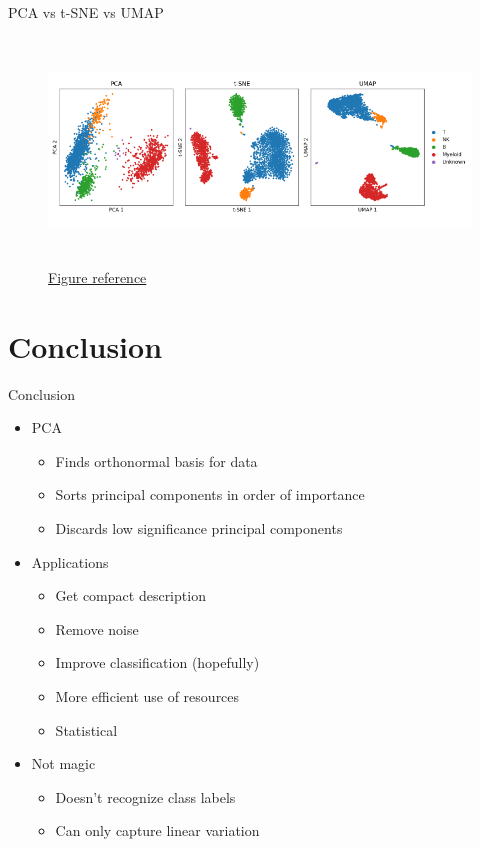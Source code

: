 \documentclass[serif, aspectratio=169]{beamer}
\begin{document}
\begin{frame}{PCA vs t-SNE vs UMAP}
         \begin{figure}[htpb]
            \begin{center}
                \includegraphics[width=12cm, height=6cm]{pic/tsne_vs_umap_pca.PNG}
                \caption{\href{https://mbernste.github.io/posts/dim_reduc/}{Figure reference}}
            \end{center}
        \end{figure}
\end{frame}

\section{Conclusion}

\begin{frame}{Conclusion}
    \begin{itemize}
        \item PCA 
        \begin{itemize}
            \item Finds orthonormal basis for data
            \item Sorts principal components in order of importance
            \item Discards low significance principal components
        \end{itemize}
        \item Applications
        \begin{itemize}
            \item Get compact description
            \item Remove noise
            \item Improve classification (hopefully)
            \item More efficient use of resources
            \item Statistical
        \end{itemize}
        \item Not magic
        \begin{itemize}
            \item  Doesn’t recognize class labels
            \item Can only capture linear variation
        \end{itemize}
    \end{itemize}
\end{frame}
\end{document}
